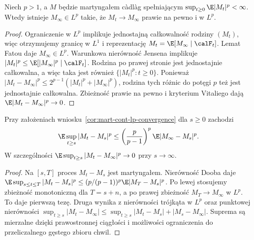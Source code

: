 \begin{wniosek}
\label{cor:mart-cont-lp-convergence}
Niech $p>1$, a $M$ będzie martyngałem c\`adl\`ag
spełniającym $\sup_{t\ge0}\E|M_t|^p<\infty$.
Wtedy istnieje $M_\infty\in L^p$ takie, że
$M_t\to M_\infty$ prawie na pewno i w $L^p$.
\end{wniosek}
\begin{proof}
Ograniczenie w $L^p$ implikuje jednostajną całkowalność
rodziny $(M_t)$, więc otrzymujemy granicę w $L^1$
i reprezentację $M_t=\E[M_\infty\mid\calF_t]$.
Lemat Fatou daje $M_\infty\in L^p$.
Warunkowa nierówność Jensena implikuje
$|M_t|^p\le\E[|M_\infty|^p\mid\calF_t]$.
Rodzina po prawej stronie jest jednostajnie całkowalna,
a więc taka jest również $\{|M_t|^p:t\ge0\}$.
Ponieważ $|M_t-M_\infty|^p\le2^{p-1}
(|M_t|^p+|M_\infty|^p)$, rodzina tych różnic do
potęgi $p$ też jest jednostajnie całkowalna.
Zbieżność prawie na pewno i kryterium Vitaliego dają
$\E|M_t-M_\infty|^p\to0$.
\end{proof}

\begin{wniosek}
\label{cor:mart-tail-max-lp}
Przy założeniach wniosku~\ref{cor:mart-cont-lp-convergence}
dla $s\ge0$ zachodzi
\[
\E\sup_{t\ge s}|M_t-M_s|^p
\le\left(\frac p{p-1}\right)^p
\E|M_\infty-M_s|^p.
\]
W szczególności
$\E\sup_{t\ge s}|M_t-M_\infty|^p\to0$
przy $s\to\infty$.
\end{wniosek}
\begin{proof}
Na $[s,T]$ proces $M_t-M_s$ jest martyngałem.
Nierówność Dooba daje
$\E\sup_{s\le t\le T}|M_t-M_s|^p
\le(p/(p-1))^p\E|M_T-M_s|^p$.
Po lewej stosujemy zbieżność monotoniczną
dla $T=s+n$, a po prawej zbieżność
$M_T\to M_\infty$ w $L^p$.
To daje pierwszą tezę. Druga wynika
z nierówności trójkąta w $L^p$ oraz
punktowej nierówności
$\sup_{t\ge s}|M_t-M_\infty|
\le\sup_{t\ge s}|M_t-M_s|+|M_s-M_\infty|$.
Suprema są mierzalne dzięki prawostronnej
ciągłości i możliwości ograniczenia
do przeliczalnego gęstego zbioru chwil.
\end{proof}


